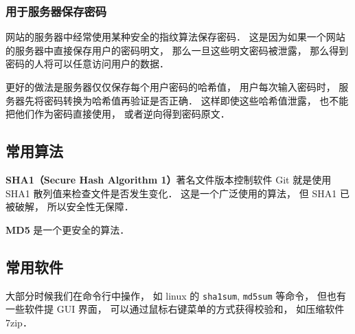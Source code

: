 \subsubsection{用于服务器保存密码}
网站的服务器中经常使用某种安全的指纹算法保存密码． 这是因为如果一个网站的服务器中直接保存用户的密码明文， 那么一旦这些明文密码被泄露， 那么得到密码的人将可以任意访问用户的数据．

更好的做法是服务器仅仅保存每个用户密码的哈希值， 用户每次输入密码时， 服务器先将密码转换为哈希值再验证是否正确． 这样即使这些哈希值泄露， 也不能把他们作为密码直接使用， 或者逆向得到密码原文．

\subsection{常用算法}
\textbf{SHA1（Secure Hash Algorithm 1）}著名文件版本控制软件 Git %
就是使用 SHA1 散列值来检查文件是否发生变化． 这是一个广泛使用的算法， 但 SHA1 已被破解， 所以安全性无保障．

\textbf{MD5} 是一个更安全的算法．

\subsection{常用软件}
大部分时候我们在命令行中操作， 如 linux 的 \verb|sha1sum|, \verb|md5sum| 等命令， 但也有一些软件提 GUI 界面， 可以通过鼠标右键菜单的方式获得校验和， 如压缩软件 7zip．
